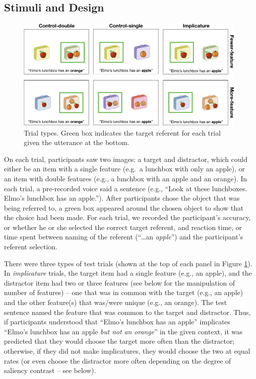 \documentclass[mask,man]{apa6}
\begin{document}
\subsection{Stimuli and Design}\label{stimuli-and-design}

\begin{figure}
\includegraphics[width=5.98in]{figs/stimuli} \caption{Trial types. Green box indicates the target referent for each trial given the utterance at the bottom.}\label{fig:stimuli}
\end{figure}

On each trial, participants saw two images: a target and distractor,
which could either be an item with a single feature (e.g.~a lunchbox
with only an apple), or an item with double features (e.g., a lunchbox
with an apple and an orange). In each trial, a pre-recorded voice said a
sentence (e.g., \enquote{Look at these lunchboxes. Elmo's lunchbox has
an apple.}). After participants chose the object that was being referred
to, a green box appeared around the chosen object to show that the
choice had been made. For each trial, we recorded the participant's
accuracy, or whether he or she selected the correct target referent, and
reaction time, or time spent between naming of the referent
(\enquote{\ldots{}an \emph{apple}}) and the participant's referent
selection.

There were three types of test trials (shown at the top of each panel in
Figure \ref{fig:stimuli}). In \emph{implicature} trials, the target item
had a single feature (e.g., an apple), and the distractor item had two
or three features (see below for the manipulation of number of features)
-- one that was in common with the target (e.g., an apple) and the other
feature(s) that was/were unique (e.g., an orange). The test sentence
named the feature that was common to the target and distractor. Thus, if
participants understood that \enquote{Elmo's lunchbox has an apple}
implicates \enquote{Elmo's lunchbox has an apple \emph{but not an
orange}} in the given context, it was predicted that they would choose
the target more often than the distractor; otherwise, if they did not
make implicatures, they would choose the two at equal rates (or even
choose the distractor more often depending on the degree of saliency
contrast -- see below).
\end{document}
